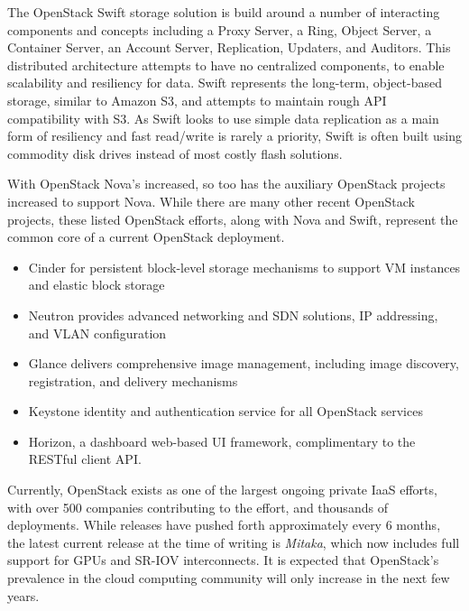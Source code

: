 The OpenStack Swift storage solution is build around a number of interacting components and concepts including a Proxy Server, a Ring, Object Server, a Container Server, an Account Server, Replication, Updaters, and Auditors. This distributed architecture attempts to have no centralized components, to enable scalability and resiliency for data.  Swift represents the long-term, object-based storage, similar to Amazon S3, and attempts to maintain rough API compatibility with S3. As Swift looks to use simple data replication as a main form of resiliency and fast read/write is rarely a priority, Swift is often built using commodity disk drives instead of most costly flash solutions.  

With OpenStack Nova's increased, so too has the auxiliary OpenStack projects increased to support Nova.  While there are many other recent OpenStack projects, these listed OpenStack efforts, along with Nova and Swift, represent the common core of a current OpenStack deployment. 
 

\begin{itemize}
\item Cinder for persistent block-level storage mechanisms to support VM instances and elastic block storage
\item Neutron provides advanced networking and SDN solutions, IP addressing, and VLAN configuration
\item Glance delivers comprehensive image management, including image discovery, registration, and delivery mechanisms 
\item Keystone identity and authentication service for all OpenStack services
\item Horizon, a dashboard web-based UI framework, complimentary to the RESTful client API.   
\end{itemize}

Currently, OpenStack exists as one of the largest ongoing private IaaS efforts, with over 500 companies contributing to the effort, and thousands of deployments. While releases have pushed forth approximately every 6 months, the latest current release at the time of writing is \emph{Mitaka}, which now includes full support for GPUs and SR-IOV interconnects. It is expected that OpenStack's prevalence in the cloud computing community will only increase in the next few years.   



